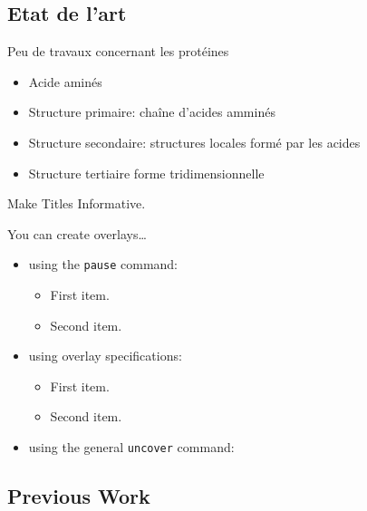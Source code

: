 \documentclass{beamer}
\begin{document}
\subsection{Etat de l'art}

\begin{frame}{Peu de travaux concernant les protéines}

    \begin{itemize}
    \item Acide aminés 
    \item Structure primaire: chaîne d'acides amminés\pause
    \item Structure secondaire: structures locales formé par les acides\pause
    \item Structure tertiaire forme tridimensionnelle \pause
    \end{itemize}
\end{frame}


\begin{frame}{Make Titles Informative.}

  You can create overlays\dots
  \begin{itemize}
  \item using the \texttt{pause} command:
    \begin{itemize}
    \item
      First item.
      \pause
    \item    
      Second item.
    \end{itemize}
  \item
    using overlay specifications:
    \begin{itemize}
    \item<3->
      First item.
    \item<4->
      Second item.
    \end{itemize}
  \item
    using the general \texttt{uncover} command:
    \begin{itemize}
    \end{itemize}
  \end{itemize}
\end{frame}


\subsection{Previous Work}
\end{document}
